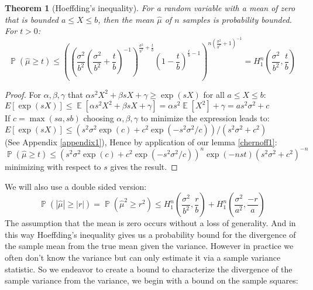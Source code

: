 \documentclass[aap,preprint]{imsart}
\newtheorem{theorem}{Theorem}
\DeclareMathOperator{\E}{\mathbb{E}}
\DeclareMathOperator{\p}{\mathbb{P}}
\begin{document}
\begin{theorem}[Hoeffding's inequality]\label{hoeffdings1}
For a random variable with a mean of zero that is bounded $a\le X\le b$, then the mean $\hat{\mu}$ of $n$ samples is probability bounded. For $t>0$:
\begin{equation}\label{eq_no2} \textstyle\p(\hat{\mu}\ge t)\le 
\left(\left(\frac{\sigma^2}{b^2}(\frac{\sigma^2}{b^2}+\frac{t}{b})^{-1}\right)^{\frac{\sigma^2}{b^2}+\frac{t}{b}}
\left(1-\frac{t}{b}\right)^{\frac{t}{b}-1}\right)^{n(\frac{\sigma^2}{b^2}+1)^{-1}} = H_1^n\left(\frac{\sigma^2}{b^2},\frac{t}{b}\right) \end{equation}
\end{theorem}
\begin{proof}
For $\alpha,\beta,\gamma$ that $\alpha s^2X^2+\beta sX+\gamma\ge \exp(sX)$ for all $a\le X\le b$:\\
$E\left[\exp(sX)\right] \le \E[\alpha s^2X^2+\beta sX+\gamma] = \alpha s^2\E[X^2]+\gamma = as^2\sigma^2+c$\\
If $c=\max(sa,sb)$ choosing $\alpha,\beta,\gamma$ to minimize the expression leads to:\\
$E\left[\exp(sX)\right] \le (s^2\sigma^2\exp(c) + c^2\exp(-s^2\sigma^2/c))/(s^2\sigma^2 + c^2) $\\
(See Appendix \ref{appendix1}), Hence by application of our lemma \ref{chernoff1}:\\
$ \textstyle\p(\hat{\mu}\ge t)\le \left(s^2\sigma^2\exp(c) + c^2\exp(-s^2\sigma^2/c)\right)^n\exp(-nst)(s^2\sigma^2 + c^2)^{-n} $\\
minimizing with respect to $s$ gives the result.
\end{proof}
We will also use a double sided version:
\begin{equation}\label{eq_no1} \textstyle\p(|\hat{\mu}|\ge |r|)=\p(\hat{\mu}^2\ge r^2)\le H_1^n\left(\frac{\sigma^2}{b^2},\frac{r}{b}\right)+H_1^n\left(\frac{\sigma^2}{a^2},\frac{-r}{a}\right) \end{equation}
The assumption that the mean is zero occurs without a loss of generality.
And in this way Hoeffding's inequality gives us a probability bound for the divergence of the sample mean from the true mean given the variance. However in practice we often don't know the variance but can only estimate it via a sample variance statistic.
So we endeavor to create a bound to characterize the divergence of the sample variance from the variance, we begin with a bound on the sample squares:
\end{document}
